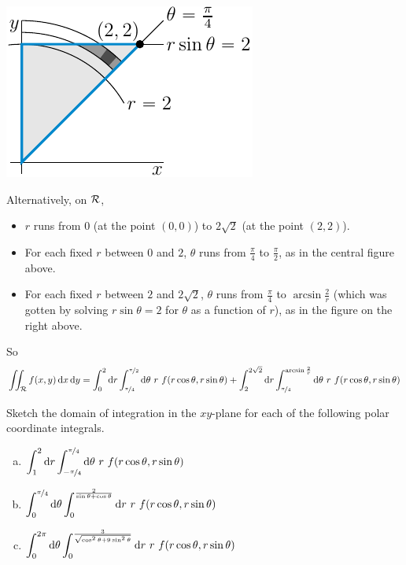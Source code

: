 \begin{solution}
\begin{center}
     \includegraphics{fig/polar5c5.pdf}
\end{center}
Alternatively, on $\mathcal{R}$,
\begin{itemize}
\item 
$r$ runs from $0$ (at the point $(0,0)$)  
to $2\sqrt{2}$ (at the point $(2,2)$). 
\item
For each fixed $r$ between $0$ and $2$, $\theta$ runs from $\frac{\pi}{4}$ 
to $\frac{\pi}{2}$, as in the central figure above.
\item
For each fixed $r$ between $2$ and $2\sqrt{2}$, $\theta$ runs 
from $\frac{\pi}{4}$ to $\arcsin\frac{2}{r}$ (which was gotten by solving 
$r\sin\theta=2$ for $\theta$ as a function of $r$), as in the figure 
on the right above.
\end{itemize}
So 
\begin{equation*}
\iint_{\mathcal{R}} f(x,y)\,\mathrm{d}x\,\mathrm{d}y
=\int_0^2\mathrm{d}r
  \int_{\nicefrac{\pi}{4}}^{\nicefrac{\pi}{2}}\mathrm{d}\theta
 \ r\ f(r\cos\theta,r\sin\theta)
+\int_2^{2\sqrt{2}}\mathrm{d}r
  \int_{\nicefrac{\pi}{4}}^{\arcsin\frac{2}{r}}\mathrm{d}\theta
 \ r\ f(r\cos\theta,r\sin\theta)
\end{equation*}

\end{solution}

\begin{question}
Sketch the domain of integration in the $xy$-plane for each of the 
following polar coordinate integrals.
\begin{enumerate}[(a)]
\item
$\displaystyle 
      \int_1^2\mathrm{d}r
     \int_{-\nicefrac{\pi}{4}}^{\nicefrac{\pi}{4}}\mathrm{d}\theta
     \ r\ f(r\cos\theta,r\sin\theta)$

\item
$\displaystyle 
     \int_0^{\nicefrac{\pi}{4}}\mathrm{d}\theta
     \int_0^{\frac{2}{\sin\theta+\cos\theta}}\mathrm{d}r
     \ r\ f(r\cos\theta,r\sin\theta)$
\item
$\displaystyle 
     \int_0^{2\pi}\mathrm{d}\theta
     \int_0^{\frac{3}{\sqrt{\cos^2\theta+9\sin^2\theta}}}\mathrm{d}r
     \ r\ f(r\cos\theta,r\sin\theta)$
\end{enumerate}
\end{question}

